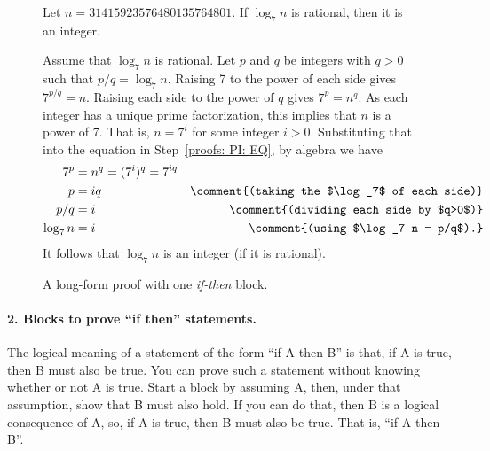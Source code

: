 \begin{figure}
\begin{framed} \small
  \begin{theorem}
    Let $n = 31415923576480135764801$.  If $\log_7 n$ is rational, then it is an integer.
  \end{theorem}
  \begin{longFormProof}
    \step Assume that $\log_7 n$ is rational.
    \step Let $p$ and $q$ be integers with $q>0$ such that $p/q = \log_7 n$.
    \step Raising 7 to the power of each side gives $7^{p/q} {} = n$.  
    \step Raising each side to the power of $q$ gives $7^p {} = n^q$.\label{proofs: PI: EQ}
    \step As each integer has a unique prime factorization, this implies that $n$ is a power of 7.
    \comment{\smash{$\vdots$}~~~}
    \step That is, $n=7^i$ for some integer $i > 0$.
    \step Substituting that into the equation in Step~\ref{proofs: PI: EQ}, by algebra we have
    \begin{align*}
      7^p & = n^q = (7^i)^q = 7^{iq} \\
      p & = iq & \comment{(taking the $\log_7$ of each side)} \\
      p/q & = i & \comment{(dividing each side by $q>0$)} \\
      \log_7 n & = i & \comment{(using $\log_7 n = p/q$).}
    \end{align*}
    \step It follows that $\log_7 n$ is an integer (if it is rational).
  \end{longFormProof}
  \vspace*{-10pt}
\end{framed}
\vspace*{-10pt}
\caption{A long-form proof with one \emph{if-then} block.}\label{proofs: fig: if then}
\vspace*{-5pt}
\end{figure}

\paragraph{2. Blocks to prove ``if then'' statements.}
The logical meaning of a statement of the form ``if A then B'' 
is that, if A is true, then B must also be true.
You can prove such a statement without knowing whether or not A is true.
Start a block by assuming A,
then, under that assumption, show that B must also hold.
If you can do that, then B is a logical consequence of A,
so, if A is true, then B must also be true.
That is, ``if A then B''.

